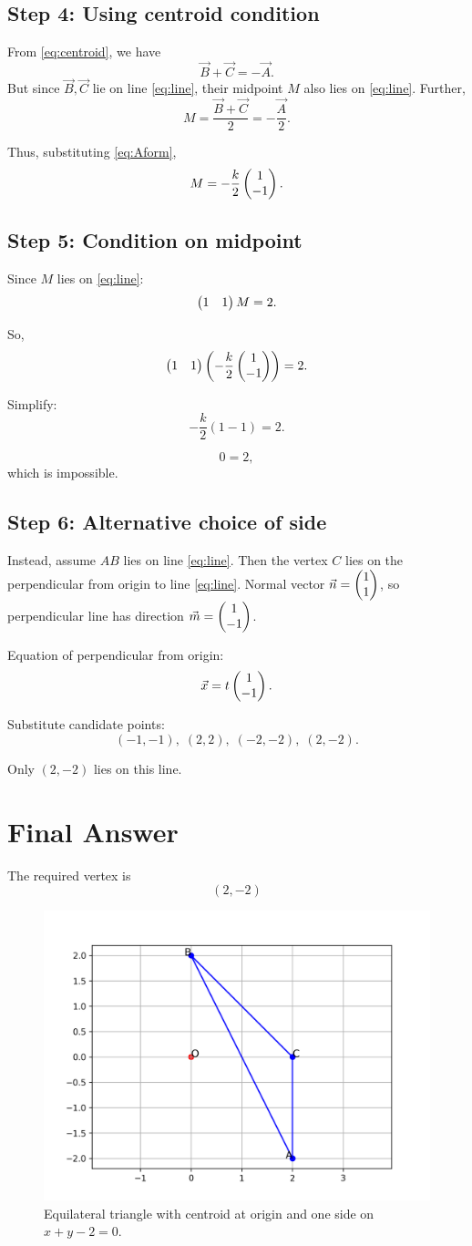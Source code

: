 \documentclass[12pt]{article}
\begin{document}
\subsection*{Step 4: Using centroid condition}
From \eqref{eq:centroid}, we have
\[
\Vec{B} + \Vec{C} = -\Vec{A}.
\]
But since \(\Vec{B},\Vec{C}\) lie on line \eqref{eq:line}, their midpoint \(M\) also lies on \eqref{eq:line}.  
Further,
\[
M = \frac{\Vec{B} + \Vec{C}}{2} = -\frac{\Vec{A}}{2}.
\]

Thus, substituting \eqref{eq:Aform},
\[
M = -\frac{k}{2}\begin{pmatrix}1 \\ -1\end{pmatrix}.
\]

\subsection*{Step 5: Condition on midpoint}
Since \(M\) lies on \eqref{eq:line}:
\[
\begin{pmatrix}1 & 1\end{pmatrix} M = 2.
\]

So,
\[
\begin{pmatrix}1 & 1\end{pmatrix}\left(-\frac{k}{2}\begin{pmatrix}1 \\ -1\end{pmatrix}\right) = 2.
\]

Simplify:
\[
-\frac{k}{2}(1-1) = 2.
\]

\[
0 = 2,
\]
which is impossible.

\subsection*{Step 6: Alternative choice of side}
Instead, assume \(AB\) lies on line \eqref{eq:line}. Then the vertex \(C\) lies on the perpendicular from origin to line \eqref{eq:line}.  
Normal vector \(\Vec{n}=\begin{pmatrix}1\\1\end{pmatrix}\), so perpendicular line has direction \(\Vec{m}=\begin{pmatrix}1\\-1\end{pmatrix}\).  

Equation of perpendicular from origin:
\[
\Vec{x} = t\begin{pmatrix}1 \\ -1\end{pmatrix}.
\]

Substitute candidate points:
\[
(-1,-1),\; (2,2),\; (-2,-2),\; (2,-2).
\]

Only \((2,-2)\) lies on this line.

\section*{Final Answer}
The required vertex is
\[
\boxed{(2,-2)}
\]

\begin{figure}[h!]
    \centering
    \includegraphics[width=0.6\linewidth]{figs/fig.png}
    \caption{Equilateral triangle with centroid at origin and one side on $x+y-2=0$.}
\end{figure}
\end{document}
